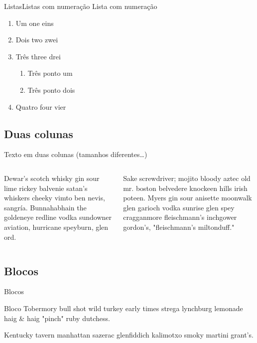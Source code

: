 \documentclass[
	brazilian, %
	12pt, %
	aspectratio = 169, %
]{beamer}
\begin{document}
\begin{frame}{Listas}{Listas com numeração}
	Lista com numeração
	
	\begin{enumerate}
		\item Um one eins
		\item Dois two zwei
		\item Três three drei
			\begin{enumerate}
				\item Três ponto um
				\item Três ponto dois
			\end{enumerate}
		\item Quatro four vier
	\end{enumerate}
\end{frame}

\subsection{Duas colunas}

\begin{frame}
	Texto em duas colunas (tamanhos diferentes\ldots)
	
	\begin{columns}
		\begin{column}{0.4\linewidth}
			Dewar's scotch whisky gin sour lime rickey balvenie satan's whiskers cheeky vimto ben nevis, sangría. Bunnahabhain the goldeneye redline vodka sundowner aviation, hurricane speyburn, glen ord.
		\end{column}
		\begin{column}{0.6\linewidth}
			 Sake screwdriver; mojito bloody aztec old mr. boston belvedere knockeen hills irish poteen. Myers gin sour anisette moonwalk glen garioch vodka sunrise glen spey cragganmore fleischmann's inchgower gordon's, "fleischmann's miltonduff." 
		\end{column}
	\end{columns}
\end{frame}

\subsection{Blocos}

\begin{frame}{Blocos}
	\begin{block}{Bloco}
		Tobermory bull shot wild turkey early times strega lynchburg lemonade haig \& haig "pinch" ruby dutchess. 
	\end{block}

	\begin{definition}
		Kentucky tavern manhattan sazerac glenfiddich kalimotxo smoky martini grant's.
	\end{definition}

\end{frame}
\end{document}
